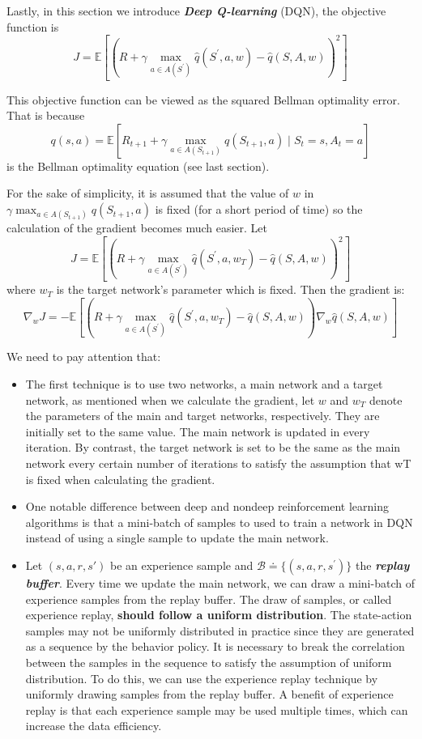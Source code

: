 \documentclass[10pt]{elegantbook}
\newcommand{\mydefination}[1]{\textbf{\textit{\textcolor{structurecolor}{#1}}}}
\begin{document}
Lastly, in this section we introduce \mydefination{Deep Q-learning} (DQN), the objective function is 
\begin{equation}
    J=\mathbb{E}\left[\left(R+\gamma\operatorname*{max}_{a\in A(S^{\prime})}{\hat{q}}(S^{\prime},a,w)-{\hat{q}}(S,A,w)\right)^{2}\right]
\end{equation}

This objective function can be viewed as the squared Bellman optimality error. That is because
\[
    q(s, a) = \mathbb{E} \left [ R_{t+1}+\gamma \max_{a\in A(S_{t+1})}q(S_{t+1},a) \mid S_{t}=s,A_{t}=a \right ]
\]
is the Bellman optimality equation (see last section).

For the sake of simplicity, it is assumed that the value of $w$ in $\gamma \max_{a\in A(S_{t+1})}q(S_{t+1},a)$ is fixed (for a short period of time)
so the calculation of the gradient becomes much easier. Let  
\[
    J=\mathbb{E}\left[\left(R+\gamma\operatorname*{max}_{a\in A(S^{\prime})}{\hat{q}}(S^{\prime},a,w_{T})-{\hat{q}}(S,A,w)\right)^{2}\right]
\]
where $w_{T}$ is the target network’s parameter which is fixed. Then the gradient is:
\begin{equation}
    \nabla_{w}J=-\mathbb{E}\left[
        \left(R+\gamma\operatorname*{max}_{a\in A(S^{\prime})}{\hat{q}}(S^{\prime},a,w_{T})-{\hat{q}}(S,A,w)\right)\nabla_{w}{\hat{q}}(S,A,w)
        \right]
\end{equation}

We need to pay attention that:
\begin{itemize}
    \item The first technique is to use two networks, a main network and a target network, as mentioned when we calculate the gradient, 
    let $w$ and $w_{T}$ denote the parameters of the main and target networks, respectively. They are initially set to the same value.
    The main network is updated in every iteration. By contrast, the target network is set to be the same as the main network every certain number of 
    iterations to satisfy the assumption that wT is fixed when calculating the gradient. 
    \item One notable difference between deep and nondeep reinforcement learning algorithms is that a mini-batch of samples to used to train a network in 
    DQN instead of using a single sample to update the main network.
    \item Let $(s, a, r, s')$ be an experience sample and $\mathcal B\doteq\{(s,a,r,s^{\prime})\}$ the \mydefination{replay buffer}. Every time we update the main 
    network, we can draw a mini-batch of experience samples from the replay buffer. The draw of samples, or called experience replay, \textbf{should follow 
    a uniform distribution}. The state-action samples may not be uniformly distributed in practice since they are generated as a sequence by the
behavior policy. It is necessary to break the correlation between the samples in the sequence to satisfy the assumption of uniform distribution. To do this, we can use
the experience replay technique by uniformly drawing samples from the replay buffer. A benefit of experience replay is that each experience sample may be used multiple
times, which can increase the data efficiency.
\end{itemize}
\end{document}
